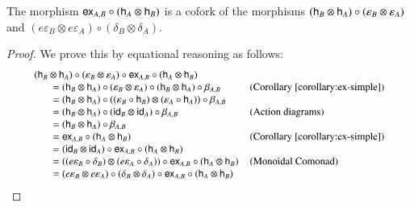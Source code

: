 \begin{lemma}
  \label{lemma:cofork-for-ex}
  The morphism $\mathsf{ex}_{A,B} \circ (\mathsf{h}_{A} \otimes \mathsf{h}_{B})$ is a cofork of
  the morphisms $(\mathsf{h}_{B} \otimes \mathsf{h}_{A}) \circ (\varepsilon_B \otimes
  \varepsilon_A)$ and $(e\varepsilon_B \otimes e\varepsilon_A) \circ
  (\delta_B \otimes \delta_A)$.
\end{lemma}
\begin{proof}
  We prove this by equational reasoning as follows:
  \[
  \small
  \begin{array}{lll}
    (\mathsf{h}_{B} \otimes \mathsf{h}_{A}) \circ (\varepsilon_B \otimes \varepsilon_A) \circ \mathsf{ex}_{A,B} \circ (\mathsf{h}_{A} \otimes \mathsf{h}_{B})
    \\\,\,\,\,\,\,\,\,\,\,\,
    = (\mathsf{h}_{B} \otimes \mathsf{h}_{A}) \circ (\varepsilon_B \otimes \varepsilon_A) \circ (\mathsf{h}_{B} \otimes \mathsf{h}_{A}) \circ \beta_{A,B}
    & \text{(Corollary~\ref{corollary:ex-simple})}\\
    \,\,\,\,\,\,\,\,\,\,\,= (\mathsf{h}_{B} \otimes \mathsf{h}_{A}) \circ ((\varepsilon_B \circ \mathsf{h}_{B}) \otimes (\varepsilon_A \circ \mathsf{h}_{A})) \circ \beta_{A,B}
    & \text{}\\
    \,\,\,\,\,\,\,\,\,\,\,= (\mathsf{h}_{B} \otimes \mathsf{h}_{A}) \circ (\mathsf{id}_B \otimes \mathsf{id}_A) \circ \beta_{A,B}
    & \text{(Action diagrams)}\\
    \,\,\,\,\,\,\,\,\,\,\,= (\mathsf{h}_{B} \otimes \mathsf{h}_{A}) \circ \beta_{A,B}
    & \text{}\\
    \,\,\,\,\,\,\,\,\,\,\,= \mathsf{ex}_{A,B} \circ (\mathsf{h}_{A} \otimes \mathsf{h}_{B})
    & \text{(Corollary~\ref{corollary:ex-simple})}\\
    \,\,\,\,\,\,\,\,\,\,\,= (\mathsf{id}_B \otimes \mathsf{id}_A) \circ \mathsf{ex}_{A,B} \circ (\mathsf{h}_{A} \otimes \mathsf{h}_{B})
    & \text{}\\
    \,\,\,\,\,\,\,\,\,\,\,= ((e\varepsilon_B \circ \delta_B) \otimes (e\varepsilon_A \circ \delta_A)) \circ \mathsf{ex}_{A,B} \circ (\mathsf{h}_{A} \otimes \mathsf{h}_{B})
    & \text{(Monoidal Comonad)}\\
    \,\,\,\,\,\,\,\,\,\,\,= (e\varepsilon_B \otimes e\varepsilon_A) \circ (\delta_B \otimes \delta_A) \circ \mathsf{ex}_{A,B} \circ (\mathsf{h}_{A} \otimes \mathsf{h}_{B})
    & \text{}\\
  \end{array}
  \]
\end{proof}

